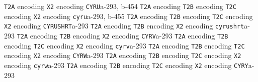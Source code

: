 \documentclass[twoside]{ltxdoc}
\makeatletter
\renewenvironment{theindex}{%
   \@restonecoltrue
   \if@twocolumn\@restonecolfalse\fi
   \columnseprule \z@
   \columnsep 35\p@
   \twocolumn[\index@prologue]%
   \IndexParms
   \let\item\@idxitem
   \ignorespaces
}{\if@restonecol\onecolumn\else\clearpage\fi}
\makeatother
\begin{document}
\begin{theindex}
    \subitem \texttt  {T2A} encoding\pfill {}
    \subitem \texttt  {X2} encoding\pfill {}
  \item \texttt  {CYRU}\pfill a-293, b-454
    \subitem \texttt  {T2A} encoding\pfill {}
    \subitem \texttt  {T2B} encoding\pfill {}
    \subitem \texttt  {T2C} encoding\pfill {}
    \subitem \texttt  {X2} encoding\pfill {}
  \item \texttt  {cyru}\pfill a-293, b-455
    \subitem \texttt  {T2A} encoding\pfill {}
    \subitem \texttt  {T2B} encoding\pfill {}
    \subitem \texttt  {T2C} encoding\pfill {}
    \subitem \texttt  {X2} encoding\pfill {}
  \item \texttt  {CYRUSHRT}\pfill a-293
    \subitem \texttt  {T2A} encoding\pfill {}
    \subitem \texttt  {T2B} encoding\pfill {}
    \subitem \texttt  {X2} encoding\pfill {}
  \item \texttt  {cyrushrt}\pfill a-293
    \subitem \texttt  {T2A} encoding\pfill {}
    \subitem \texttt  {T2B} encoding\pfill {}
    \subitem \texttt  {X2} encoding\pfill {}
  \item \texttt  {CYRV}\pfill a-293
    \subitem \texttt  {T2A} encoding\pfill {}
    \subitem \texttt  {T2B} encoding\pfill {}
    \subitem \texttt  {T2C} encoding\pfill {}
    \subitem \texttt  {X2} encoding\pfill {}
  \item \texttt  {cyrv}\pfill a-293
    \subitem \texttt  {T2A} encoding\pfill {}
    \subitem \texttt  {T2B} encoding\pfill {}
    \subitem \texttt  {T2C} encoding\pfill {}
    \subitem \texttt  {X2} encoding\pfill {}
  \item \texttt  {CYRW}\pfill a-293
    \subitem \texttt  {T2A} encoding\pfill {}
    \subitem \texttt  {T2B} encoding\pfill {}
    \subitem \texttt  {T2C} encoding\pfill {}
    \subitem \texttt  {X2} encoding\pfill {}
  \item \texttt  {cyrw}\pfill a-293
    \subitem \texttt  {T2A} encoding\pfill {}
    \subitem \texttt  {T2B} encoding\pfill {}
    \subitem \texttt  {T2C} encoding\pfill {}
    \subitem \texttt  {X2} encoding\pfill {}
  \item \texttt  {CYRY}\pfill a-293

\end{theindex}
\end{document}
